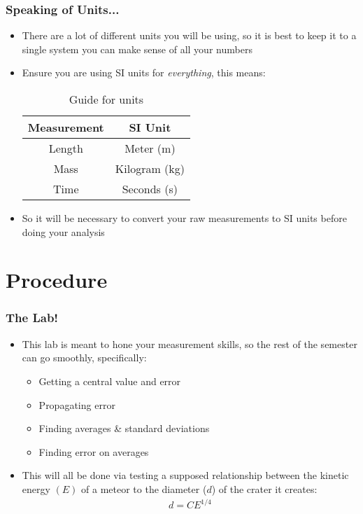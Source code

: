 \documentclass[aspectratio=169]{beamer}
\begin{document}
\begin{frame}
  \frametitle{Speaking of Units...}
  \begin{itemize}
  \item There are a lot of different units you will be using, so it is best to keep it to a single system you can make sense of all your numbers
  \item Ensure you are using SI units for \emph{everything}, this means:
    \begin{table}[H]
      \centering
      \begin{tabular}{c|c}
        Measurement & SI Unit \\\hline
        Length      & Meter (m) \\
        Mass        & Kilogram (kg) \\
        Time        & Seconds (s)
      \end{tabular}
      \caption{Guide for units}
    \end{table}
  \item So it will be necessary to convert your raw measurements to SI units before doing your analysis
  \end{itemize}
\end{frame}

\section{Procedure}
\begin{frame}
  \frametitle{The Lab!}
  \begin{itemize}
  \item This lab is meant to hone your measurement skills, so the rest of the semester can go smoothly, specifically:
    \begin{itemize}
    \item Getting a central value and error
    \item Propagating error
    \item Finding averages \& standard deviations
    \item Finding error on averages
    \end{itemize}
  \item This will all be done via testing a supposed relationship between the kinetic energy $(E)$ of a meteor to the diameter ($d$) of the crater it creates:
    \begin{align*}
      d=CE^{1/4}
    \end{align*}
  \end{itemize}
\end{frame}
\end{document}
